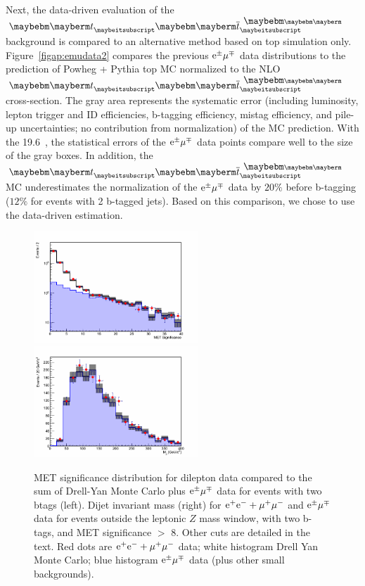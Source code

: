 Next, the data-driven evaluation of the $\Pqt \Paqt$ background is compared to an alternative
method based on top simulation only. 
Figure~\ref{figap:emudata2} compares the previous $\mathrm{e}^\pm\mu^\mp$ data distributions to the prediction of
Powheg + Pythia top MC normalized to the NLO $\Pqt \Paqt$ cross-section.
The gray area represents the systematic error (including luminosity, lepton trigger and ID efficiencies,
b-tagging efficiency, mistag efficiency, and pile-up uncertainties; no contribution from normalization) of the MC
prediction. With the 19.6~\fbinv{}, the statistical errors of the $\mathrm{e}^\pm\mu^\mp$ data points compare well
to the size of the gray boxes. In addition, the $\Pqt \Paqt$ MC underestimates the normalization of the
$\mathrm{e}^\pm\mu^\mp$ data by $20\%$ before b-tagging ($12\%$ for events with  2 b-tagged jets). Based on this comparison,
we chose to use the data-driven estimation.

\begin{figure}[!htb]
  \centerline{
    \includegraphics[width=0.55\textwidth]{plots/emu_mets1l_2dy}
    \includegraphics[width=0.55\textwidth]{plots/emu_zjjm2_2dy_side}
  }
  \caption{ \label{figap:emu_ll_comp_met} MET significance distribution
    for dilepton data compared to the sum of Drell-Yan Monte Carlo
    plus $\mathrm{e}^\pm\mu^\mp$ data for events with two btags (left).
    Dijet invariant mass (right) for $\mathrm{e^+e^-} + \mu^+\mu^-$ and $\mathrm{e}^\pm\mu^\mp$
    data for events outside the leptonic $Z$ mass window, with two
    b-tags, and MET significance $>$ 8. Other cuts are
    detailed in the text.
    Red dots are $\mathrm{e^+e^-}+\mu^+\mu^-$ data; white
    histogram Drell Yan Monte Carlo; blue histogram $\mathrm{e}^\pm\mu^\mp$ data (plus
    other small backgrounds).}

\end{figure}

